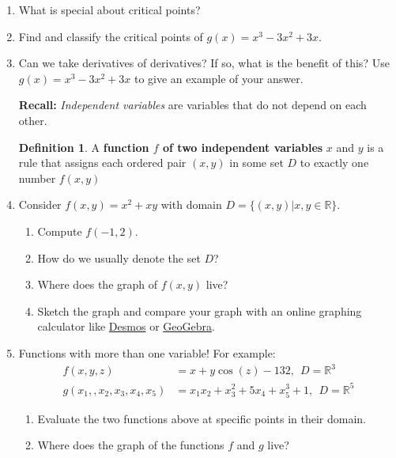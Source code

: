 \documentclass[12pt]{amsart}
\newcommand{\R}{\mathbb{R}}
\theoremstyle{definition}
\newtheorem*{definition}{Definition}
\begin{document}
\begin{enumerate}[itemsep=2.5em,leftmargin=0pt]
\vspace{-2em}

\item What is special about critical points?


\item Find and classify the critical points of $g(x)=x^3-3x^2+3x$.


\item\label{ex:deriv2} Can we take derivatives of derivatives? If so, what is the benefit of this? Use $g(x)=x^3-3x^2+3x$ to give an example of your answer.

\vspace{2.5em}

\noindent \textbf{Recall:} {\it Independent variables} are variables that do not depend on each other. 

\begin{definition}
    A {\bf function $f$ of two independent variables} $x$ and $y$ is a rule that assigns each ordered pair $(x,y)$ in some set $D$ to exactly one number $f(x,y)$
\end{definition}

\vspace{-2em}

\item Consider $f(x,y)=x^2+xy$ with domain $D=\{(x,y)|x,y\in\R\}$. 
\begin{enumerate}
    \item Compute $f(-1,2)$.
    \item How do we usually denote the set $D$?
    \item Where does the graph of $f(x,y)$ live?
    \item Sketch the graph and compare your graph with an online graphing calculator like \href{https://www.desmos.com/3d}{Desmos} or \href{https://www.geogebra.org/3d}{GeoGebra}.
\end{enumerate}


\item Functions with more than one variable! For example:
\begin{align*}
    f(x,y,z) &= x+y\cos(z)-132,~~D=\R^3 \\
    g(x_1,,x_2,x_3,x_4,x_5) &= x_1x_2+x_3^2+5x_4+x_5^3+1,~~D=\R^5
\end{align*}
\begin{enumerate}
    \item Evaluate the two functions above at specific points in their domain.
    \item Where does the graph of the functions $f$ and $g$ live? 
\end{enumerate}


\end{enumerate}
\end{document}
